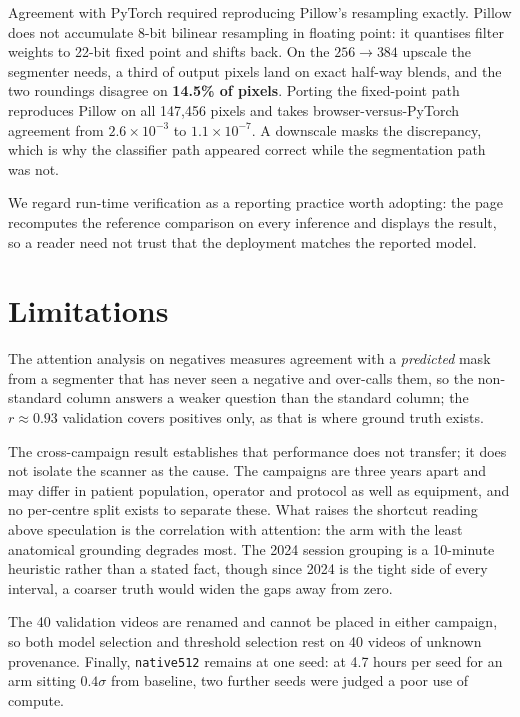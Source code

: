 \documentclass[conference]{IEEEtran}
\begin{document}
Agreement with PyTorch required reproducing Pillow's resampling exactly.
Pillow does not accumulate 8-bit bilinear resampling in floating point: it
quantises filter weights to 22-bit fixed point and shifts back. On the
$256\rightarrow384$ upscale the segmenter needs, a third of output pixels land
on exact half-way blends, and the two roundings disagree on \textbf{14.5\% of
pixels}. Porting the fixed-point path reproduces Pillow on all 147{,}456 pixels
and takes browser-versus-PyTorch agreement from $2.6\times10^{-3}$ to
$1.1\times10^{-7}$. A downscale masks the discrepancy, which is why the
classifier path appeared correct while the segmentation path was not.

We regard run-time verification as a reporting practice worth adopting: the
page recomputes the reference comparison on every inference and displays the
result, so a reader need not trust that the deployment matches the reported
model.

\section{Limitations}

The attention analysis on negatives measures agreement with a \emph{predicted}
mask from a segmenter that has never seen a negative and over-calls them, so
the non-standard column answers a weaker question than the standard column; the
$r\approx0.93$ validation covers positives only, as that is where ground truth
exists.

The cross-campaign result establishes that performance does not transfer; it
does not isolate the scanner as the cause. The campaigns are three years apart
and may differ in patient population, operator and protocol as well as
equipment, and no per-centre split exists to separate these. What raises the
shortcut reading above speculation is the correlation with attention: the arm
with the least anatomical grounding degrades most. The 2024 session grouping is
a 10-minute heuristic rather than a stated fact, though since 2024 is the tight
side of every interval, a coarser truth would widen the gaps away from zero.

The 40 validation videos are renamed and cannot be placed in either campaign,
so both model selection and threshold selection rest on 40 videos of unknown
provenance. Finally, \texttt{native512} remains at one seed: at 4.7 hours per
seed for an arm sitting $0.4\sigma$ from baseline, two further seeds were
judged a poor use of compute.
\end{document}
